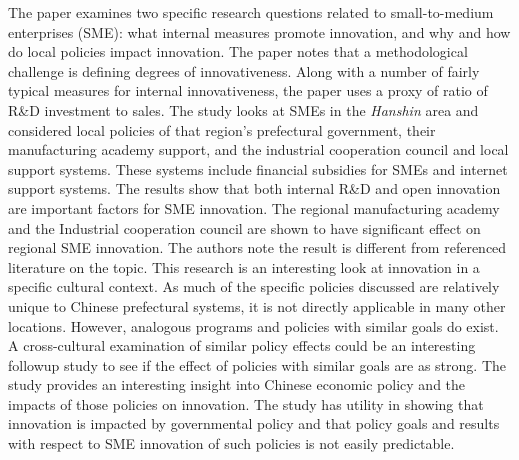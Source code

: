\begin{adjustwidth}{1in}{}
  \begin{hangpara}{.25in}{1}
    \end{hangpara}
\end{adjustwidth}
The paper examines two specific research questions related to small-to-medium enterprises (SME): what internal measures promote innovation, and why and how do local policies impact innovation. The paper notes that a methodological challenge is defining degrees of innovativeness. Along with a number of fairly typical measures for internal innovativeness, the paper uses a proxy of ratio of R\&D investment to sales. The study looks at SMEs in the \textit{Hanshin} area and considered local policies of that region's prefectural government, their manufacturing academy support, and the industrial cooperation council and local support systems. These systems include financial subsidies for SMEs and internet support systems. The results show that both internal R\&D and open innovation are important factors for SME innovation. The regional manufacturing academy and the Industrial cooperation council are shown to have significant effect on regional SME innovation. The authors note the result is different from referenced literature on the topic. This research is an interesting look at innovation in a specific cultural context. As much of the specific policies discussed are relatively unique to Chinese prefectural systems, it is not directly applicable in many other locations. However, analogous programs and policies with similar goals do exist. A cross-cultural examination of similar policy effects could be an interesting followup study to see if the effect of policies with similar goals are as strong. The study provides an interesting insight into Chinese economic policy and the impacts of those policies on innovation. The study has utility in showing that innovation is impacted by governmental policy and that policy goals and results with respect to SME innovation of such policies is not easily predictable.

